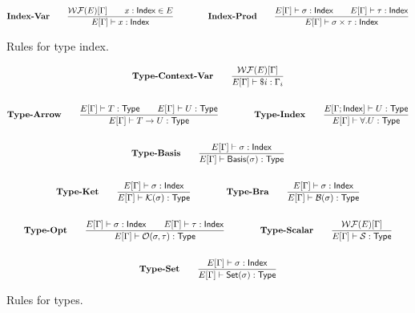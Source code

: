 \documentclass{article}
\begin{document}
\begin{figure}
    \begin{gather*}
        \textbf{Index-Var} \qquad
        \frac{\mathcal{WF}(E)[\Gamma] \qquad x : \mathsf{Index} \in E}{E[\Gamma] \vdash x : \mathsf{Index}}
        \qquad \qquad
        \textbf{Index-Prod} \qquad
        \frac{E[\Gamma] \vdash \sigma : \mathsf{Index} \qquad E[\Gamma] \vdash \tau : \mathsf{Index}}{E[\Gamma] \vdash \sigma \times \tau : \mathsf{Index}}
    \end{gather*}
    \caption{Rules for type index.}
\end{figure}

\begin{figure}
    \begin{gather*}
        \textbf{Type-Context-Var} \qquad
        \frac{\mathcal{WF}(E)[\Gamma]}{E[\Gamma]\vdash \$i : \Gamma_i}
        \\
        \\
        \textbf{Type-Arrow} \qquad
        \frac{E[\Gamma] \vdash T : \mathsf{Type} \qquad E[\Gamma] \vdash U : \mathsf{Type}}{E[\Gamma] \vdash T \to U : \mathsf{Type}}
        \qquad \qquad
        \textbf{Type-Index} \qquad
        \frac{E[\Gamma ; \mathsf{Index}] \vdash U : \mathsf{Type}}{E[\Gamma] \vdash \forall.U : \mathsf{Type}} \\
        \\        
        \textbf{Type-Basis} \qquad
        \frac{E[\Gamma] \vdash \sigma : \mathsf{Index}}{E[\Gamma] \vdash \mathsf{Basis}(\sigma) : \mathsf{Type}}  \\
        \\
        \textbf{Type-Ket} \qquad
        \frac{E[\Gamma] \vdash \sigma : \mathsf{Index}}{E[\Gamma] \vdash \mathcal{K}(\sigma) : \mathsf{Type}}
        \qquad \qquad
        \textbf{Type-Bra} \qquad
        \frac{E[\Gamma] \vdash \sigma : \mathsf{Index}}{E[\Gamma] \vdash \mathcal{B}(\sigma) : \mathsf{Type}} \\
        \\
        \textbf{Type-Opt} \qquad
        \frac{E[\Gamma] \vdash \sigma : \mathsf{Index} \qquad E[\Gamma] \vdash \tau : \mathsf{Index}}{E[\Gamma] \vdash \mathcal{O}(\sigma, \tau) : \mathsf{Type}}
        \qquad \qquad
        \textbf{Type-Scalar} \qquad
        \frac{\mathcal{WF}(E)[\Gamma]}{E[\Gamma] \vdash \mathcal{S} : \mathsf{Type}} \\
        \\
        \textbf{Type-Set} \qquad
        \frac{E[\Gamma] \vdash \sigma : \mathsf{Index}}{E[\Gamma] \vdash \mathsf{Set}(\sigma) : \mathsf{Type}}
    \end{gather*}
    \caption{Rules for types.}
\end{figure}
\end{document}
